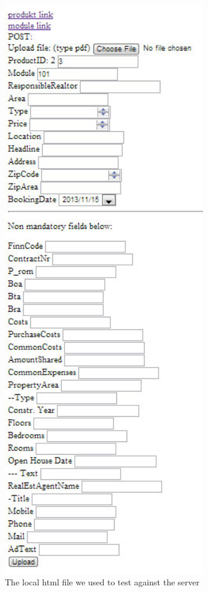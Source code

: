 \begin{center}
\begin{figure}
\includegraphics[height = 25cm]{images/localTest.jpg}
\caption{The local html file we used to test against the server}
\end{figure}
\end{center}
